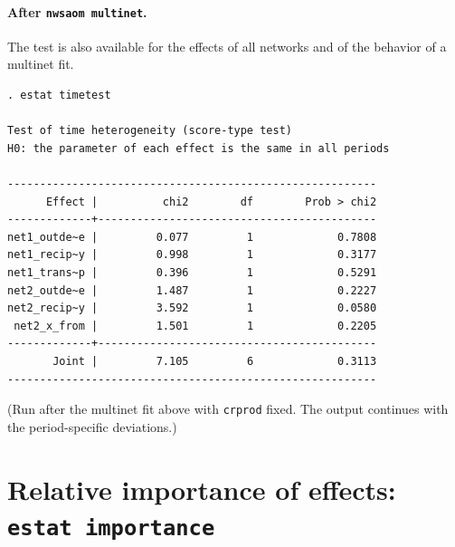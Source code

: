 \paragraph{After \texttt{nwsaom multinet}.} The test is also available for the effects of all networks and of the behavior of a multinet fit.
\begin{lstlisting}
. estat timetest

Test of time heterogeneity (score-type test)
H0: the parameter of each effect is the same in all periods

---------------------------------------------------------
      Effect |          chi2        df        Prob > chi2
-------------+-------------------------------------------
net1_outde~e |         0.077         1             0.7808
net1_recip~y |         0.998         1             0.3177
net1_trans~p |         0.396         1             0.5291
net2_outde~e |         1.487         1             0.2227
net2_recip~y |         3.592         1             0.0580
 net2_x_from |         1.501         1             0.2205
-------------+-------------------------------------------
       Joint |         7.105         6             0.3113
---------------------------------------------------------
\end{lstlisting}
(Run after the multinet fit above with \texttt{crprod} fixed. The output continues with the period-specific deviations.)

\section{Relative importance of effects: \texttt{estat importance}}

